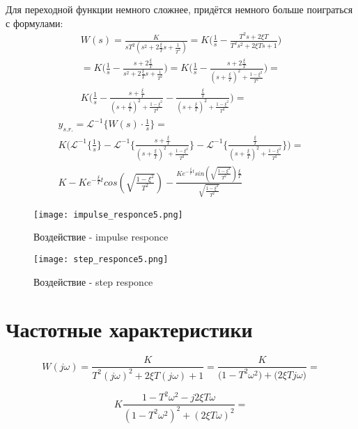 Для переходной функции немного сложнее, придётся немного больше поиграться с формулами:
$$
  \begin{aligned}
    W(s) = \frac{K}{sT^2(s^2 + 2\frac{\xi}{T}s + \frac{1}{T^2})} = K\bigg(\frac{1}{s} - \frac{T^2s+2\xi T}{T^2s^2 +2\xi Ts + 1}\bigg)  \\
    = K\bigg(\frac{1}{s} - \frac{s+2\frac{\xi}{T}}{s^2 +2\frac{\xi}{T}s + \frac{1}{T^2}}\bigg) = K\bigg(\frac{1}{s} - \frac{s+2\frac{\xi}{T}}{(s + \frac{\xi}{T})^2 + \frac{1-\xi^2}{T^2}}\bigg) = \\
    K\bigg(\frac{1}{s} - \frac{s+\frac{\xi}{T}}{(s + \frac{\xi}{T})^2 + \frac{1-\xi^2}{T^2}} - \frac{\frac{\xi}{T}}{(s + \frac{\xi}{T})^2 + \frac{1-\xi^2}{T^2}}\bigg) = 
  \end{aligned}
$$
$$
  \begin{aligned}
    y_{s.r.} = \mathcal{L}^{-1}\{W(s)\cdot\frac{1}{s}\} = \\
    K \bigg(\mathcal{L}^{-1}\{\frac{1}{s}\} - \mathcal{L}^{-1}\{  \frac{s+\frac{\xi}{T}}{(s + \frac{\xi}{T})^2 + \frac{1-\xi^2}{T^2}} \} - \mathcal{L}^{-1}\{  \frac{\frac{\xi}{T}}{(s + \frac{\xi}{T})^2 + \frac{1-\xi^2}{T^2}} \} \bigg) = 
    \\K - Ke^{-\frac{\xi}{T}t}cos(\sqrt{\frac{1-\xi^2}{T^2}})- \frac{Ke^{-\frac{\xi}{T}t}sin(\sqrt{\frac{1-\xi^2}{T^2}})\frac{\xi}{T}}{\sqrt{\frac{1-\xi^2}{T^2}}} 
  \end{aligned}
$$

\newpage
\begin{figure}[ht]
  \centering
  \texttt{[image: impulse\_responce5.png]}
  \caption{Воздействие - \textrm{impulse responce}}
\end{figure}

\begin{figure}[ht]
    \centering
    \texttt{[image: step\_responce5.png]}
    \caption{Воздействие - \textrm{step responce}}
  \end{figure}
\newpage

\section{Частотные характеристики}

$$
W(j\omega) =  \frac{K}{T^2(j\omega)^2 + 2\xi T(j\omega) + 1} = \frac{K}{\bigg(1 - T^2\omega^2\bigg) + \bigg(2\xi Tj\omega\bigg)} = 
$$

$$
  K\frac{ 1 - T^2\omega^2 -  j2\xi T\omega}{ (1 - T^2\omega^2)^2 + (2\xi T\omega)^2 } =  
$$

